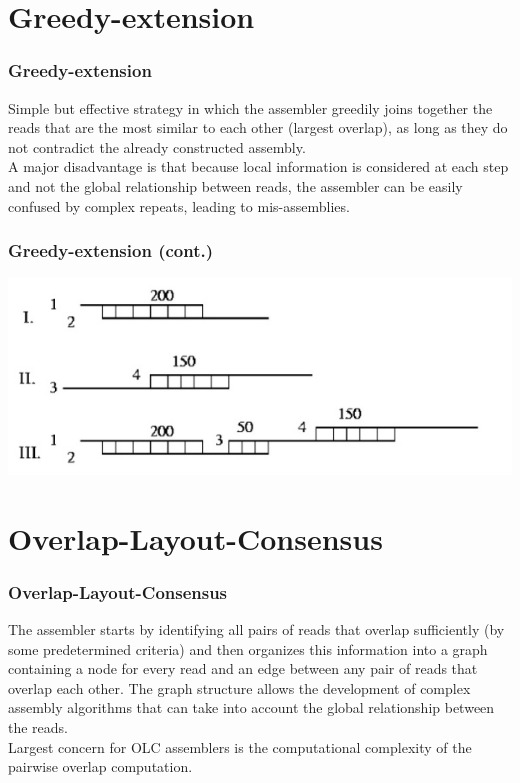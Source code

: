 \documentclass[pdf]{beamer}
\begin{document}
\section{Greedy-extension}
\begin{frame}
\frametitle{Greedy-extension}
Simple but effective strategy in which the assembler greedily joins together the reads that are the most similar to each other (largest overlap), as long as they do not contradict the already constructed assembly.\\ 
\vspace{0.2in}
A major disadvantage is that because local information is considered at each step and not the global relationship between reads, the assembler can be easily confused by complex repeats, leading to mis-assemblies.
\end{frame}

\begin{frame}
\frametitle{Greedy-extension (cont.)}
\begin{center}
\includegraphics[scale=1]{Figures/greedy.jpg} 
\end{center}
\end{frame}

\section{Overlap-Layout-Consensus}

\begin{frame}[fragile]
\frametitle{Overlap-Layout-Consensus}
The assembler starts by identifying all pairs of reads that overlap sufficiently (by some predetermined criteria) and then organizes this information into a graph containing a node for every read and an edge between any pair of reads that overlap each other. The graph structure allows the development of complex assembly algorithms that can take into account the global relationship between the reads.\\
\vspace{0.2in}
Largest concern for OLC assemblers is the computational complexity of the pairwise overlap computation.
\end{frame} 
\end{document}
